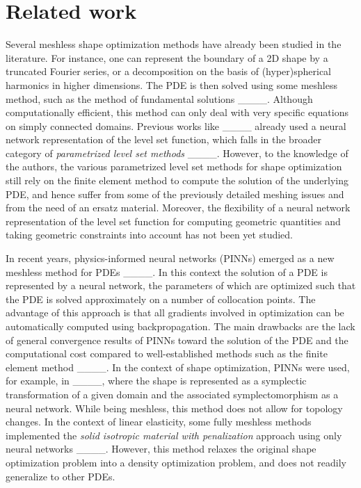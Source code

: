 \section{Related work}
Several meshless shape optimization methods have already been studied in the literature. 
For instance, one can represent the boundary of a 2D shape by a truncated Fourier series, or a decomposition on the basis of (hyper)spherical harmonics in higher dimensions.
The PDE is then solved using some meshless method, such as the method of fundamental solutions ____. 
Although computationally efficient, this method can only deal with very specific equations on simply connected domains.
Previous works like ____ already used a neural network representation of the level set function, which falls in the broader category of \textit{parametrized level set methods} ____. However, to the knowledge of the authors, the various parametrized level set methods for shape optimization still rely on the finite element method to compute the solution of the underlying PDE, and hence suffer from some of the previously detailed meshing issues and from the need of an ersatz material. Moreover, the flexibility of a neural network representation of the level set function for computing geometric quantities and taking geometric constraints into account has not been yet studied.

In recent years, physics-informed neural networks (PINNs) emerged as a new meshless method for PDEs ____. 
In this context the solution of a PDE is represented by a neural network, the parameters of which are optimized such that the PDE is solved approximately on a number of collocation points. 
The advantage of this approach is that all gradients involved in optimization can be automatically computed using backpropagation.
The main drawbacks are the lack of general convergence results of PINNs toward the solution of the PDE and the computational cost compared to well-established methods such as the finite element method ____.
In the context of shape optimization, PINNs were used, for example, in ____, where the shape is represented as a symplectic transformation of a given domain and the associated symplectomorphism as a neural network. 
While being meshless, this method does not allow for topology changes. In the context of linear elasticity, some fully meshless methods implemented the \emph{solid isotropic material with penalization} approach using only neural networks ____. However, this method relaxes the original shape optimization problem into a density optimization problem, and does not readily generalize to other PDEs.